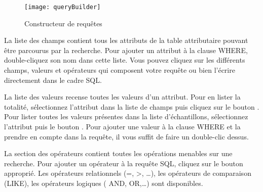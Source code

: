 \begin{figure}[ht]
  \begin{center}
    \texttt{[image: queryBuilder]}
    \caption{Constructeur de requêtes \nixcaption} \label{fig:query_builder}
  \end{center}
\end{figure}

La liste des champs contient tous les attributs de la table attributaire pouvant être parcourus par la recherche. Pour ajouter un attribut à la clause WHERE, double-cliquez son nom dans cette liste. Vous pouvez cliquez sur les différents champs, valeurs et opérateurs qui composent votre requête ou bien l'écrire directement dans le cadre SQL.

La liste des valeurs recense toutes les valeurs d'un attribut. Pour en lister la totalité, sélectionnez l'attribut dans la liste de champs puis cliquez sur le bouton . Pour lister toutes les valeurs présentes dans la liste d'échantillons, sélectionnez l'attribut puis le bouton . Pour ajouter une valeur à la clause WHERE et la prendre en compte dans la requête, il vous suffit de faire un double-clic dessus.

La section des opérateurs contient toutes les opérations menables sur une recherche. Pour ajouter un opérateur à la requête SQL, cliquez sur le bouton approprié. Les opérateurs relationnels (=, >, \dots), les opérateurs de comparaison (LIKE), les opérateurs logiques ( AND, OR,\dots) sont disponibles.

